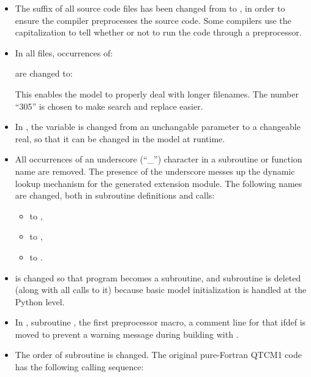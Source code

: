 \begin{itemize}
\item The suffix of all source code files 
	has been changed from  to , 
	in order to ensure the compiler preprocesses 
	the source code.  Some compilers use the capitalization to
	tell whether or not to run the code through a preprocessor.

\item In all  files, occurrences of:
	\begin{codeblock}
	\end{codeblock}
	are changed to:
	\begin{codeblock}
	\codeblockfont{%
	Character(len=305)}
	\end{codeblock}
	This enables the model to properly deal with longer filenames.
	The number ``305'' is chosen to make search and replace easier.

\item In , the 
	 variable is changed from an unchangable
	parameter to a changeable real, 
	so that it can be changed in the model at runtime.

\item All occurrences of an underscore (``\_'') character in a
	subroutine or function name are removed.  The
	presence of the underscore messes up the dynamic lookup
	mechanism for the  generated extension module.
	The following names are changed, both in subroutine definitions
	and calls:
	\begin{itemize}
	\item {} to ,
	\item {} to ,
	\item {} to .
	\end{itemize}

\item {} is changed so that program
	 becomes a subroutine, and 
	subroutine  is deleted (along with
	all calls to it) because basic model initialization is
	handled at the Python level.

\item In , subroutine , the first
	 preprocessor macro, a comment line for
	that ifdef is moved to prevent a warning message during
	building with .

\item The order of subroutine  is changed.  The original
	pure-Fortran QTCM1  code has the following
	calling sequence:


\end{itemize}
